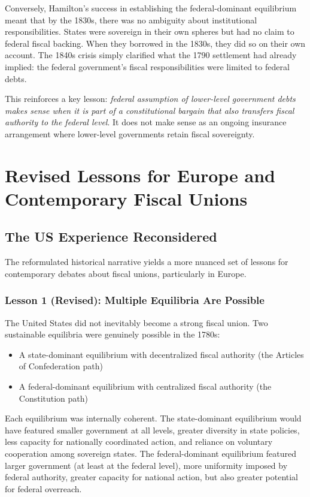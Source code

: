 \documentclass[12pt]{article}
\begin{document}
Conversely, Hamilton's success in establishing the federal-dominant equilibrium meant that by the 1830s, there was no ambiguity about institutional responsibilities. States were sovereign in their own spheres but had no claim to federal fiscal backing. When they borrowed in the 1830s, they did so on their own account. The 1840s crisis simply clarified what the 1790 settlement had already implied: the federal government's fiscal responsibilities were limited to federal debts.

This reinforces a key lesson: \textit{federal assumption of lower-level government debts makes sense when it is part of a constitutional bargain that also transfers fiscal authority to the federal level}. It does not make sense as an ongoing insurance arrangement where lower-level governments retain fiscal sovereignty.

\section{Revised Lessons for Europe and Contemporary Fiscal Unions}

\subsection{The US Experience Reconsidered}

The reformulated historical narrative yields a more nuanced set of lessons for contemporary debates about fiscal unions, particularly in Europe.

\subsubsection{Lesson 1 (Revised): Multiple Equilibria Are Possible}

The United States did not inevitably become a strong fiscal union. Two sustainable equilibria were genuinely possible in the 1780s:
\begin{itemize}
\item A state-dominant equilibrium with decentralized fiscal authority (the Articles of Confederation path)
\item A federal-dominant equilibrium with centralized fiscal authority (the Constitution path)
\end{itemize}

Each equilibrium was internally coherent. The state-dominant equilibrium would have featured smaller government at all levels, greater diversity in state policies, less capacity for nationally coordinated action, and reliance on voluntary cooperation among sovereign states. The federal-dominant equilibrium featured larger government (at least at the federal level), more uniformity imposed by federal authority, greater capacity for national action, but also greater potential for federal overreach.
\end{document}

